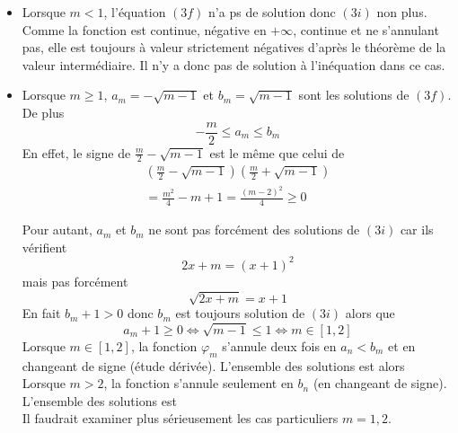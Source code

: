 \begin{itemize}
 \item Lorsque $m<1$, l'équation $(3f)$ n'a ps de solution donc $(3i)$ non plus. Comme la fonction est continue, négative en $+\infty$, continue et ne s'annulant pas, elle est toujours à valeur strictement négatives d'après le théorème de la valeur intermédiaire. Il n'y a donc pas de solution à l'inéquation dans ce cas. 
 \item Lorsque $m\geq1$, $a_m = -\sqrt{m-1}$ et $b_m = \sqrt{m-1}$ sont les solutions de $(3f)$.  De plus 
\begin{displaymath}
 -\frac{m}{2} \leq a_m \leq b_m
\end{displaymath}
En effet, le signe de $\frac{m}{2}-\sqrt{m-1}$ est le même que celui de
\begin{multline*}
\left(\frac{m}{2}-\sqrt{m-1} \right) \left(\frac{m}{2}+\sqrt{m-1} \right) \\
= \frac{m^2}{4}-m+1 =\frac{(m-2)^2}{4}\geq 0
\end{multline*}

Pour autant, $a_m$ et $b_m$ ne sont pas forcément des solutions de $(3i)$ car ils vérifient
\begin{displaymath}
  2x+m = (x+1)^2
\end{displaymath}
mais pas forcément
\begin{displaymath}
  \sqrt{2x+m} = x+1
\end{displaymath}
En fait $b_m + 1>0$ donc $b_m$ est toujours solution de $(3i)$ alors que 
\begin{displaymath}
  a_m + 1 \geq 0 \Leftrightarrow \sqrt{m-1}\leq 1 \Leftrightarrow m\in [1,2]
\end{displaymath}
Lorsque $m\in [1,2]$, la fonction $\varphi_m$ s'annule deux fois en $a_n<b_m$ et en changeant de signe (étude dérivée). L'ensemble des solutions est alors
\begin{displaymath}
  [-\sqrt{m-1},\sqrt{m-1}]
\end{displaymath}
Lorsque $m>2$, la fonction s'annule seulement en $b_n$ (en changeant de signe). L'ensemble des solutions est
\begin{displaymath}
  [-\frac{m}{2},\sqrt{m-1}]
\end{displaymath}
Il faudrait examiner plus sérieusement les cas particuliers $m=1,2$.
\end{itemize}

 
